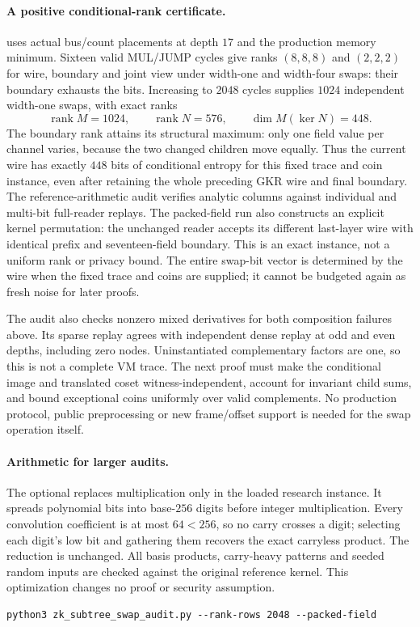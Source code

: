 \paragraph{A positive conditional-rank certificate.}  uses actual bus/count placements at depth $17$ and the production memory minimum. Sixteen valid MUL/JUMP cycles give ranks $(8,8,8)$ and $(2,2,2)$ for wire, boundary and joint view under width-one and width-four swaps: their boundary exhausts the bits. Increasing to $2048$ cycles supplies $1024$ independent width-one swaps, with exact ranks
\[
 \operatorname{rank}M=1024,\qquad \operatorname{rank}N=576,
 \qquad\dim M(\ker N)=448.
\]
The boundary rank attains its structural maximum: only one field value per channel varies, because the two changed children move equally. Thus the current wire has exactly $448$ bits of conditional entropy for this fixed trace and coin instance, even after retaining the whole preceding GKR wire and final boundary. The reference-arithmetic audit verifies analytic columns against individual and multi-bit full-reader replays. The packed-field run also constructs an explicit kernel permutation: the unchanged reader accepts its different last-layer wire with identical prefix and seventeen-field boundary. This is an exact instance, not a uniform rank or privacy bound. The entire swap-bit vector is determined by the wire when the fixed trace and coins are supplied; it cannot be budgeted again as fresh noise for later proofs.

The audit also checks nonzero mixed derivatives for both composition failures above. Its sparse replay agrees with independent dense replay at odd and even depths, including zero nodes. Uninstantiated complementary factors are one, so this is not a complete VM trace. The next proof must make the conditional image and translated coset witness-independent, account for invariant child sums, and bound exceptional coins uniformly over valid complements. No production protocol, public preprocessing or new frame/offset support is needed for the swap operation itself.

\paragraph{Arithmetic for larger audits.} The optional  replaces multiplication only in the loaded research instance. It spreads polynomial bits into base-$256$ digits before integer multiplication. Every convolution coefficient is at most $64<256$, so no carry crosses a digit; selecting each digit's low bit and gathering them recovers the exact carryless product. The reduction is unchanged. All basis products, carry-heavy patterns and seeded random inputs are checked against the original reference kernel. This optimization changes no proof or security assumption.
\begin{verbatim}
python3 zk_subtree_swap_audit.py --rank-rows 2048 --packed-field
\end{verbatim}

